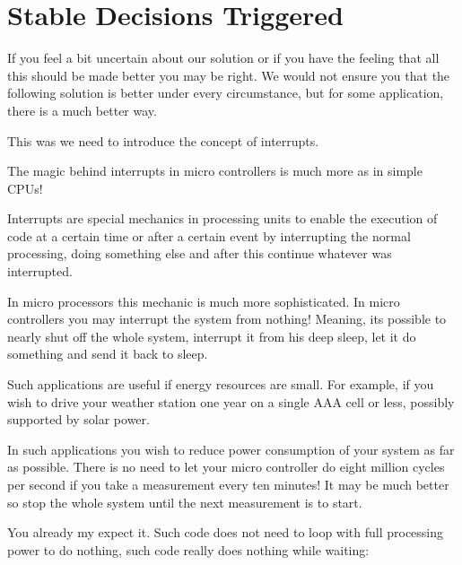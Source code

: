 \section{Stable Decisions Triggered}

If you feel a bit uncertain about our solution or if you have the feeling that all this should be made better you may be right. We would not ensure you that the following solution is better under every circumstance, but for some application, there is a much better way.

This was we need to introduce the concept of interrupts.

The magic behind interrupts in micro controllers is much more as in simple CPUs!

Interrupts are special mechanics in processing units to enable the execution of code at a certain time or after a certain event by interrupting the normal processing, doing something else and after this continue whatever was interrupted.

In micro processors this mechanic is much more sophisticated. In micro controllers you may interrupt the system from nothing! Meaning, its possible to nearly shut off the whole system, interrupt it from his deep sleep, let it do something and send it back to sleep.

Such applications are useful if energy resources are small. For example, if you wish to drive your weather station one year on a single AAA cell or less, possibly supported by solar power.

In such applications you wish to reduce power consumption of your system as far as possible. There is no need to let your micro controller do eight million cycles per second if you take a measurement every ten minutes! It may be much better so stop the whole system until the next measurement is to start.

You already my expect it. Such code does not need to loop with full processing power to do nothing, such code really does nothing while waiting:

